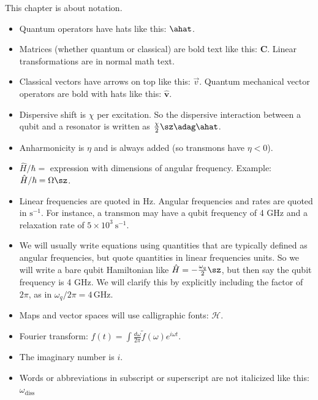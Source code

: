 This chapter is about notation.

\begin{itemize}
\item Quantum operators have hats like this: $\ahat$.

\item Matrices (whether quantum or classical) are bold text like this: $\mathbf{C}$. Linear transformations are in normal math text.

\item Classical vectors have arrows on top like this: $\vec{v}$. Quantum mechanical vector operators are bold with hats like this: $\mathbf{\hat{v}}$.

\item Dispersive shift is $\chi$ per excitation. So the dispersive interaction between a qubit and a resonator is written as $\frac{\chi}{2}\sz\adag\ahat$.

\item Anharmonicity is $\eta$ and is always added (so transmons have $\eta < 0 $).

\item $\hat{H} / \hbar =$  expression with dimensions of angular frequency. Example: $\hat{H} / \hbar = \Omega \sz$.

\item Linear frequencies are quoted in Hz. Angular frequencies and rates are quoted in $\mathrm{s}^{-1}$. For instance, a transmon may have a qubit frequency of 4 GHz and a relaxation rate of $5\times10^3 \ \mathrm{s}^{-1}$.

\item We will usually write equations using quantities that are typically defined as angular frequencies, but quote quantities in linear frequencies units. So we will write a bare qubit Hamiltonian like $\hat{H} = -\frac{\omega_q}{2}\sz$, but then say the qubit frequency is 4 GHz. We will clarify this by explicitly including the factor of $2\pi$, as in $\omega_q / 2\pi = 4\,\text{GHz}$.

\item Maps and vector spaces will use calligraphic fonts: $\mathcal{H}$. 

\item Fourier transform: $f(t) = \int \frac{d\omega}{2 \pi} \tilde{f}(\omega) e^{i \omega t}$.

\item The imaginary number is $i$.

\item Words or abbreviations in subscript or superscript are not italicized like this: $\omega_\mathrm{diss}$
\end{itemize}